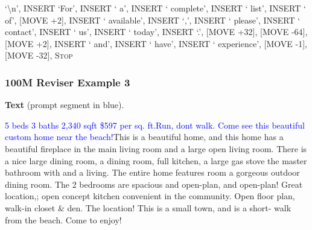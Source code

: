 \documentclass[11pt]{article}
\DeclareRobustCommand{\Stop}{\ifmmode\text{\textsc{Stop}}\else\textsc{Stop}\fi}
\begin{document}
{`\textbackslash{}n', INSERT `For', INSERT ` a', INSERT ` complete', INSERT ` list', INSERT ` of', [MOVE +2], INSERT ` available', INSERT `,', INSERT ` please', INSERT ` contact', INSERT ` us', INSERT ` today', INSERT `.', [MOVE +32], [MOVE -64], [MOVE +2], INSERT ` and', INSERT ` have', INSERT ` experience', [MOVE -1], [MOVE -32], \Stop\par
}
\vspace{0.8em}
\subsubsection*{100M Reviser Example 3}
\textbf{Text} (prompt segment in blue).\par
\ttfamily\small \textcolor{blue}{5 beds \textbar{} 3 baths \textbar{} 2,340 sqft \textbar{} \$597 per sq. ft.\newline Run, dont walk. Come see this beautiful custom home near the beach!}\newline This is a beautiful home, and this home has a beautiful fireplace in the main living room and a large open living room. There is a nice large dining room, a dining room, full kitchen, a large gas stove the master bathroom with and a living. The entire home features room a gorgeous outdoor dining room. The 2 bedrooms are spacious and open-plan, and open-plan! Great location,; open concept kitchen convenient in the community. Open floor plan, walk-in closet \& den. The location! This is a small town, and is a short- walk from the beach. Come to enjoy!
\end{document}

